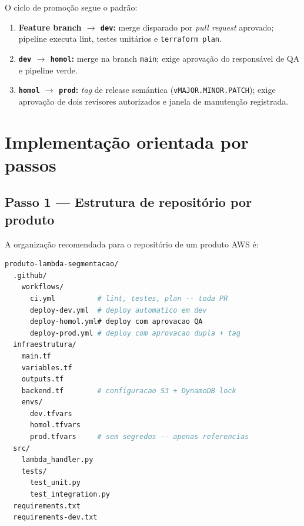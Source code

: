 O ciclo de promo\c{c}\~ao segue o padr\~ao:

\begin{enumerate}[leftmargin=*]
  \item \textbf{Feature branch $\to$ \texttt{dev}:} merge disparado por
        \textit{pull request} aprovado; pipeline executa
        lint, testes unit\'arios e \texttt{terraform plan}.
  \item \textbf{\texttt{dev} $\to$ \texttt{homol}:} merge na branch
        \texttt{main}; exige aprova\c{c}\~ao do respons\'avel de QA e
        pipeline verde.
  \item \textbf{\texttt{homol} $\to$ \texttt{prod}:} \textit{tag} de
        release sem\'antica
        (\texttt{vMAJOR.MINOR.PATCH}); exige aprova\c{c}\~ao de dois
        revisores autorizados e janela de manuten\c{c}\~ao registrada.
\end{enumerate}

\section{Implementa\c{c}\~ao orientada por passos}

\subsection{Passo 1 --- Estrutura de reposit\'orio por produto}

A organiza\c{c}\~ao recomendada para o reposit\'orio de um produto AWS \'e:

\begin{lstlisting}[language=bash,
  caption={Estrutura de reposit\'orio de produto AWS banc\'ario.},
  label={lst:repo_estrutura}]
produto-lambda-segmentacao/
  .github/
    workflows/
      ci.yml          # lint, testes, plan -- toda PR
      deploy-dev.yml  # deploy automatico em dev
      deploy-homol.yml# deploy com aprovacao QA
      deploy-prod.yml # deploy com aprovacao dupla + tag
  infraestrutura/
    main.tf
    variables.tf
    outputs.tf
    backend.tf        # configuracao S3 + DynamoDB lock
    envs/
      dev.tfvars
      homol.tfvars
      prod.tfvars     # sem segredos -- apenas referencias
  src/
    lambda_handler.py
    tests/
      test_unit.py
      test_integration.py
  requirements.txt
  requirements-dev.txt
\end{lstlisting}

